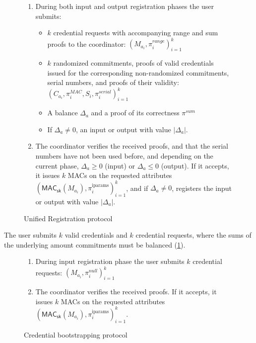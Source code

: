 \documentclass{article}
\begin{document}
\begin{figure}[h!]
    \begin{mdframed}
    \begin{enumerate}
        \item During both input and output registration phases the user submits:
        \begin{itemize}
            \item $k$ credential requests with accompanying range and sum proofs to the coordinator:  $(M_{a_i},\pi^{\textit{range}}_{i})^{k}_{i=1}$
            \item $k$ randomized commitments, proofs of valid credentials issued for the corresponding non-randomized commitments, serial numbers, and proofs of their validity: $(C_{a_i},\pi_{i}^{\mathit{MAC}},S_i,\pi_i^{\textit{serial}})^{k}_{i=1}$
            \item A balance $\Delta_{a}$ and a proof of its correctness $\pi^{\textit{sum}}$
            \item If $\Delta_{a} \ne 0$, an input or output with value $|\Delta_{a}|$.
        \end{itemize}
        \item The coordinator verifies the received proofs, and that the serial numbers have not been used before, and depending on the current phase, $\Delta_{a} \geq 0$ (input) or $\Delta_{a} \leq 0$ (output). If it accepts, it issues $k$ MACs on the requested attributes $(\mathsf{MAC}_\mathsf{sk}(M_{a_i}), \pi_i^{\mathrm{iparams}})^{k}_{i=1}$, and if $\Delta_{a} \ne 0$, registers the input or output with value $|\Delta_{a}|$.
    \end{enumerate}
    \end{mdframed}
    \caption{Unified Registration protocol}
    \label{fig:reissue}
\end{figure}

The user submits $k$ valid credentials and $k$ credential requests, where the sums of the underlying amount commitments must be balanced (\cref{fig:reissue}).

\begin{figure}[h!]
  \begin{mdframed}
    \begin{enumerate}
    \item During input registration phase the user submits $k$ credential requests:  $(M_{a_i},\pi^{\mathit{null}}_{i})^{k}_{i=1}$
    \item The coordinator verifies the received proofs. If it accepts, it issues $k$ MACs on the requested attributes $(\mathsf{MAC}_\mathsf{sk}(M_{a_i}), \pi_i^{\mathrm{iparams}})^{k}_{i=1}$.
    \end{enumerate}
  \end{mdframed}
  \caption{Credential bootstrapping protocol}
  \label{fig:bootstrap}
\end{figure}
\end{document}
